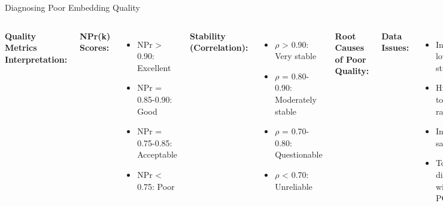 \documentclass[aspectratio=169]{beamer}
\begin{document}
\begin{frame}{Diagnosing Poor Embedding Quality}
\begin{columns}
\textbf{Quality Metrics Interpretation:}

\textbf{NPr(k) Scores:}
\begin{itemize}
\item NPr > 0.90: Excellent
\item NPr = 0.85-0.90: Good
\item NPr = 0.75-0.85: Acceptable
\item NPr < 0.75: Poor
\end{itemize}

\textbf{Stability (Correlation):}
\begin{itemize}
\item $\rho$ > 0.90: Very stable
\item $\rho$ = 0.80-0.90: Moderately stable
\item $\rho$ = 0.70-0.80: Questionable
\item $\rho$ < 0.70: Unreliable
\end{itemize}

\textbf{Root Causes of Poor Quality:}

\textbf{Data Issues:}
\begin{itemize}
\item Intrinsically low structure
\item High noise-to-signal ratio
\item Insufficient samples
\item Too many dimensions without PCA
\end{itemize}

\textbf{Decision Tree for Poor Quality:}

\end{columns}
\end{frame}
\end{document}
